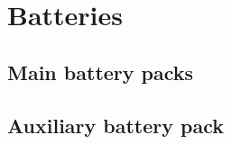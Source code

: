 \chapter{Batteries}
\blindtext

\section{Main battery packs}
\blindtext

\section{Auxiliary battery pack}
\blindtext
